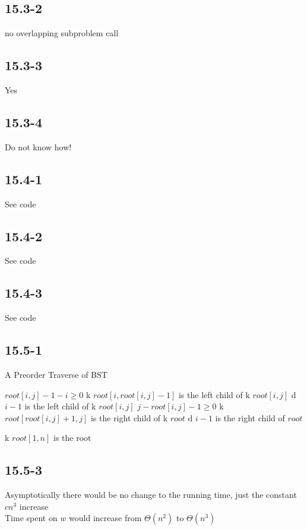 \documentclass[]{article}
\begin{document}
\subsection{15.3-2}
no overlapping subproblem call

\subsection{15.3-3}
Yes

\subsection{15.3-4}
Do not know how!

\subsection{15.4-1}
See code

\subsection{15.4-2}
See code

\subsection{15.4-3}
See code

\subsection{15.5-1}
A Preorder Traverse of BST

\begin{codebox}
	\li \If $root[i,j]-1-i \ge 0$ \Then
	\li k $root[i,root[i,j]-1]$ is the left child of k $root[i,j]$
	\li {}
	\li \Else d $i-1$ is the left child of k $root[i,j]$
	\End
	\li \If $j-root[i,j]-1\ge 0$ \Then
	\li k $root[root[i,j]+1, j]$ is the right child of k $root$
	\li {}
	\li \Else d $i-1$ is the right child of $root$
	\End
\end{codebox}

\begin{codebox}
	\li k $root[1,n]$ is the root
	\li {}
\end{codebox}

\subsection{15.5-3}
Asymptotically there would be no change to the running time, just the constant $cn^3$ increase\\
Time spent on $w$ would increase from $\Theta(n^2)$ to $\Theta(n^3)$
\end{document}
